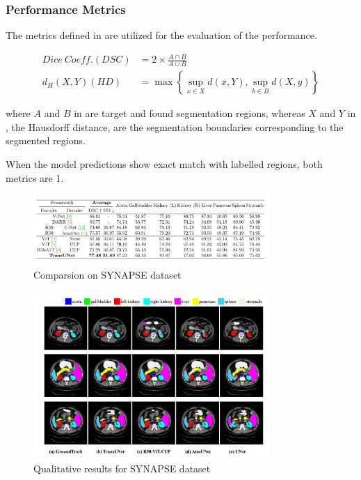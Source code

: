 \documentclass{IEEEtran}
\begin{document}
\subsubsection{Performance Metrics} 

The metrics defined in  are utilized for the evaluation of the performance.

\begin{align}
    Dice \ Coeff.(DSC) &= 2 \times \frac{A \cap B}{A \cup B} \label{eq:DC}\\
    d_H(X,Y) (HD) &= \max \left\{ \sup_{x\in X} d(x,Y),\sup_{b\in B} d(X,y) \right\} \label{eq:HD}
\end{align}

where $A$ and $B$ in  are target and found segmentation regions, whereas $X$ and $Y$ in , the Hausdorff distance, are the segmentation boundaries corresponding to the segmented regions.

When the model predictions show exact match with labelled regions, both metrics are 1. 

\begin{figure}[h]
\centering
\includegraphics[width=0.8\textwidth]{img/table1.png}
\caption{Comparsion on SYNAPSE dataset}\label{fig:table}
\end{figure}

\begin{figure}[h]
\centering
\includegraphics[width=0.8\textwidth]{img/results_qual.png}
\caption{Qualitative results for SYNAPSE dataset}\label{fig:synapseseg}
\end{figure}
\end{document}
